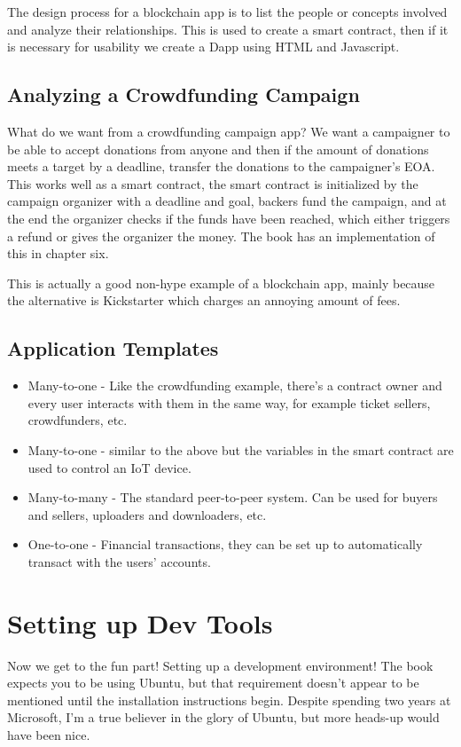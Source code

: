 \documentclass{article}
\begin{document}
The design process for a blockchain app is to list the people or concepts involved and analyze their relationships. This is used to create a smart contract,
then if it is necessary for usability we create a Dapp using HTML and Javascript.

\subsection{Analyzing a Crowdfunding Campaign}
What do we want from a crowdfunding campaign app? We want a campaigner to be able to accept donations from anyone and then if the amount of donations meets a target by a deadline, transfer the donations to the campaigner's EOA. This works well as a smart contract, the smart contract is initialized by the campaign organizer with a deadline and goal, backers fund the campaign, and at the end the organizer checks if the funds have been reached, which either triggers a refund or gives the organizer the money. The book has an implementation of this in chapter six.

This is actually a good non-hype example of a blockchain app, mainly because the alternative is Kickstarter which charges an annoying amount of fees.

\subsection{Application Templates}
\begin{itemize}
\item Many-to-one - Like the crowdfunding example, there's a contract owner and every user interacts with them in the same way, for example ticket sellers, crowdfunders, etc.
\item Many-to-one - similar to the above but the variables in the smart contract are used to control an IoT device.
\item Many-to-many - The standard peer-to-peer system. Can be used for buyers and sellers, uploaders and downloaders, etc.
\item One-to-one - Financial transactions, they can be set up to automatically transact with the users' accounts.
\end{itemize}

\section{Setting up Dev Tools}
Now we get to the fun part! Setting up a development environment! The book expects you to be using Ubuntu, but that requirement doesn't appear to be
mentioned until the installation instructions begin. Despite spending two years at Microsoft, I'm a true believer in the glory of Ubuntu, but more heads-up would have been nice.
\end{document}
